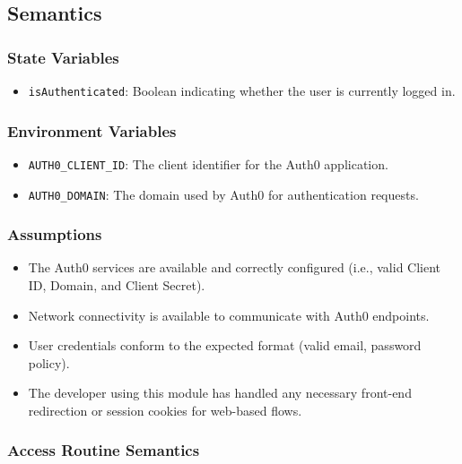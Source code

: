 \documentclass[12pt, titlepage]{article}
\begin{document}
\subsection{Semantics}

\subsubsection{State Variables}

\begin{itemize}
    \item \texttt{isAuthenticated}: Boolean indicating whether the user is currently logged in.
\end{itemize}

\subsubsection{Environment Variables}

\begin{itemize}
  \item \texttt{AUTH0\_CLIENT\_ID}: The client identifier for the Auth0 application.
  \item \texttt{AUTH0\_DOMAIN}: The domain used by Auth0 for authentication requests.
\end{itemize}

\subsubsection{Assumptions}

\begin{itemize}
    \item The Auth0 services are available and correctly configured (i.e., valid Client ID, Domain, and Client Secret).
    \item Network connectivity is available to communicate with Auth0 endpoints.
    \item User credentials conform to the expected format (valid email, password policy).
    \item The developer using this module has handled any necessary front-end redirection or session cookies for web-based flows.
\end{itemize}

\subsubsection{Access Routine Semantics}
\end{document}
